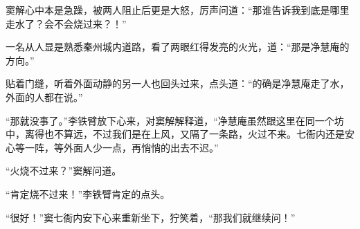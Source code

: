 窦解心中本是急躁，被两人阻止后更是大怒，厉声问道：“那谁告诉我到底是哪里走水了？会不会烧过来？！”

一名从人显是熟悉秦州城内道路，看了两眼红得发亮的火光，道：“那是净慧庵的方向。”

贴着门缝，听着外面动静的另一人也回头过来，点头道：“的确是净慧庵走了水，外面的人都在说。”

“那就没事了。”李铁臂放下心来，对窦解解释道，“净慧庵虽然跟这里在同一个坊中，离得也不算远，不过我们是在上风，又隔了一条路，火过不来。七衙内还是安心等一阵，等外面人少一点，再悄悄的出去不迟。”

“火烧不过来？”窦解问道。

“肯定烧不过来！”李铁臂肯定的点头。

“很好！”窦七衙内安下心来重新坐下，狞笑着，“那我们就继续问！”

